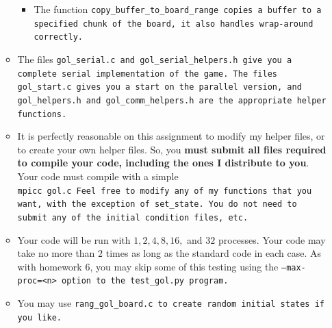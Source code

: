 \documentclass{article}
\begin{document}
\begin{enumerate}
\begin{itemize}
\begin{itemize}
  \item The function \tt{copy\_buffer\_to\_board\_range} copies a
    buffer to a specified chunk of the board, it also handles
    wrap-around correctly.  
  \end{itemize}

\item The files \tt{gol\_serial.c} and \tt{gol\_serial\_helpers.h}
  give you a complete serial implementation of the game.  The files
  \tt{gol\_start.c} gives you a start on the parallel version, and
  \tt{gol\_helpers.h} and \tt{gol\_comm\_helpers.h} are the
  appropriate helper functions. 

\item It is perfectly reasonable on this assignment to modify my
  helper files, or to create your own helper files.  So, you
  \textbf{must submit all files required to compile your code,
    including the ones I distribute to you}.  Your code must compile
  with a simple\\
\tt{mpicc gol.c}
Feel free to modify any of my functions that you want, with the
exception of \tt{set\_state}. You do not need to submit any of the
initial condition files, etc. 

\item Your code will be run with $1,2,4,8,16,$ and $32$ processes.
  Your code may take no more than $2$ times as long as the standard
  code in each case.  As with homework 6, you may skip some of this
  testing using the \tt{--max-proc=<n>} option to the
  \tt{test\_gol.py} program. 

\item You may use \tt{rang\_gol\_board.c} to create random initial
  states if you like. 

\end{itemize}


\end{enumerate}
\end{document}
